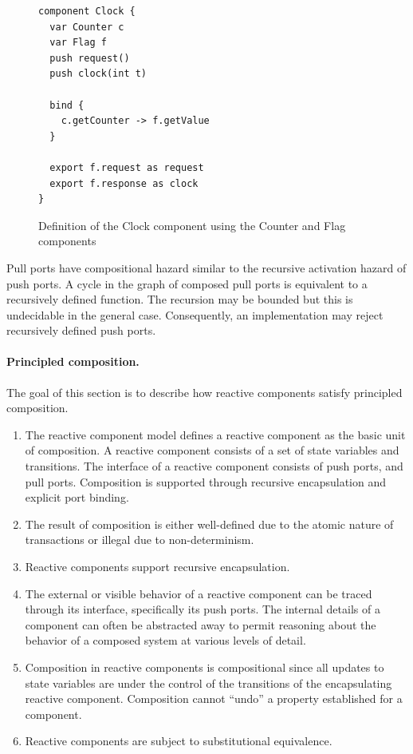 \begin{figure}
\begin{verbatim}
component Clock {
  var Counter c
  var Flag f
  push request()
  push clock(int t)

  bind {
    c.getCounter -> f.getValue
  }

  export f.request as request
  export f.response as clock
}
\end{verbatim}
\caption{Definition of the Clock component using the Counter and Flag components\label{factored2_clock_component}}
\end{figure}

Pull ports have compositional hazard similar to the recursive activation hazard of push ports.
A cycle in the graph of composed pull ports is equivalent to a recursively defined function.
The recursion may be bounded but this is undecidable in the general case.
Consequently, an implementation may reject recursively defined push ports.

\paragraph{Principled composition.}
The goal of this section is to describe how reactive components satisfy principled composition.
\begin{enumerate}
\item The reactive component model defines a reactive component as the basic unit of composition.
A reactive component consists of a set of state variables and transitions.
The interface of a reactive component consists of push ports, and pull ports.
Composition is supported through recursive encapsulation and explicit port binding.

\item The result of composition is either well-defined due to the atomic nature of transactions or illegal due to non-determinism.

\item Reactive components support recursive encapsulation.

\item The external or visible behavior of a reactive component can be traced through its interface, specifically its push ports.
The internal details of a component can often be abstracted away to permit reasoning about the behavior of a composed system at various levels of detail.

\item Composition in reactive components is compositional since all updates to state variables are under the control of the transitions of the encapsulating reactive component.
Composition cannot ``undo'' a property established for a component.

\item Reactive components are subject to substitutional equivalence.
\end{enumerate}

